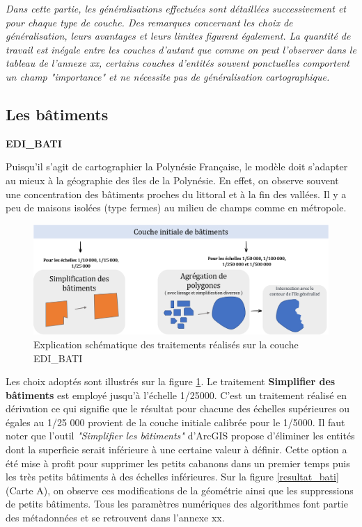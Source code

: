 \textit{Dans cette partie, les généralisations effectuées sont détaillées successivement et pour chaque type de couche. Des remarques concernant les choix de généralisation, leurs avantages et leurs limites figurent également. La quantité de travail est inégale entre les couches d'autant que comme on peut l'observer dans le tableau de l'annexe xx, certains couches d'entités souvent ponctuelles comportent un champ "importance" et ne nécessite pas de généralisation cartographique.}

\subsection{Les bâtiments}
\begin{center}
    \footnotesize
    \textbf{EDI\_BATI}
\end{center}
Puisqu'il s'agit de cartographier la Polynésie Française, le modèle doit s'adapter au mieux à la géographie des îles de la Polynésie. En effet, on observe souvent une concentration des bâtiments proches du littoral et à la fin des vallées. Il y a peu de maisons isolées (type fermes) au milieu de champs comme en métropole.

\begin{figure}[ht]
\centering
\includegraphics[width=\linewidth]{images/chap1/batiment_mb.png}
\caption{Explication schématique des traitements réalisés sur la couche EDI\_BATI}
\label{bati_mb}
\end{figure}

Les choix adoptés sont illustrés sur la figure \ref{bati_mb}. Le traitement \textbf{ Simplifier des bâtiments} est employé jusqu'à l'échelle 1/25000. C'est un traitement réalisé en dérivation ce qui signifie que le résultat pour chacune des échelles supérieures ou égales au 1/25 000 provient de la couche initiale calibrée pour le 1/5000. Il faut noter que l'outil \textit{"Simplifier les bâtiments"} d'ArcGIS propose d'éliminer les entités dont la superficie serait inférieure à une certaine valeur à définir. Cette option a été mise à profit pour supprimer les petits cabanons dans un premier temps puis les très petits bâtiments à des échelles inférieures. Sur la figure \ref{resultat_bati} (Carte A), on observe ces modifications de la géométrie ainsi que les suppressions de petits bâtiments. Tous les paramètres numériques des algorithmes font partie des métadonnées et se retrouvent dans l'annexe xx.

